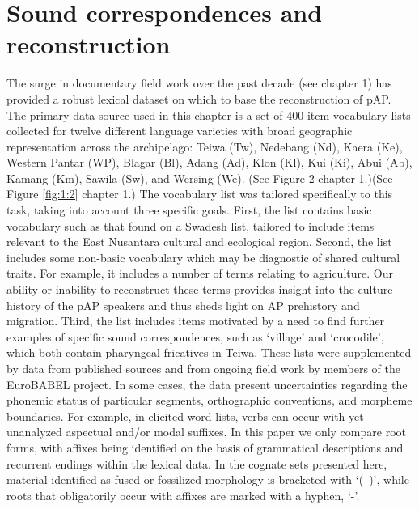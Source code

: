 \section{Sound correspondences and reconstruction}
\label{bkm:Ref214155962}The surge in documentary field work over the past decade (see chapter 1) has provided a robust lexical dataset on which to base the reconstruction of pAP. The primary data source used in this chapter is a set of 400-item vocabulary lists collected for twelve different language varieties with broad geographic representation across the archipelago: Teiwa (Tw), Nedebang (Nd), Kaera (Ke), Western Pantar (WP), Blagar (Bl), Adang (Ad), Klon (Kl), Kui (Ki), Abui (Ab), Kamang (Km), Sawila (Sw), and Wersing (We). (See Figure 2 chapter 1.)(See Figure \ref{fig:1:2} chapter 1.) The vocabulary list was tailored specifically to this task, taking into account three specific goals. First, the list contains basic vocabulary such as that found on a Swadesh list, tailored to include items relevant to the East Nusantara cultural and ecological region. Second, the list includes some non-basic vocabulary which may be diagnostic of shared cultural traits. For example, it includes a number of terms relating to agriculture. Our ability or 
inability to reconstruct these terms provides insight into the culture history of the pAP speakers and thus sheds light on AP prehistory and migration. Third, the list includes items motivated by a need to find further examples of specific sound correspondences, such as `village' and `crocodile', which both contain pharyngeal fricatives in Teiwa. These lists were supplemented by data from published sources and from ongoing field work by members of the EuroBABEL project. In some cases, the data present uncertainties regarding the phonemic status of particular segments, orthographic conventions, and morpheme boundaries. For example, in elicited word lists, verbs can occur with yet unanalyzed aspectual and/or modal suffixes. In this paper we only compare root forms, with affixes being identified on the basis of grammatical descriptions and recurrent endings within the lexical data. In the cognate sets presented here, material identified as fused or fossilized morphology is bracketed with `(~)', while roots that 
obligatorily occur with affixes are marked with a hyphen, `-'. 

